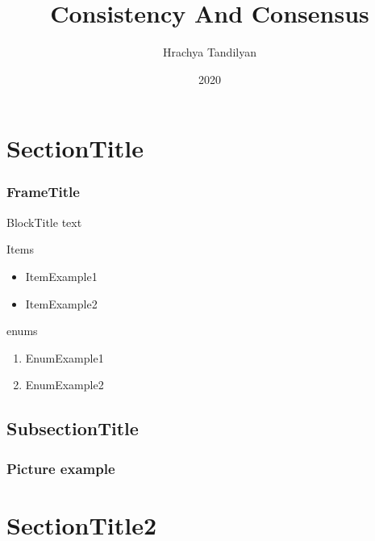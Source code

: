 \documentclass{beamer}
\begin{document}
\title[Consistency And Consensus]{Consistency And Consensus}
\author[Hrachya Tandilyan\copyright]{Hrachya Tandilyan}
\date{2020}

\begin{frame}
\titlepage
\end{frame}

\section{SectionTitle}
\begin{frame}\frametitle{FrameTitle}
\begin{block}{BlockTitle}
    text
\end{block}
\vfill
Items
\begin{itemize}
    \item ItemExample1
    \item ItemExample2
\end{itemize}
\vfill
enums
\begin{enumerate}
    \item EnumExample1
    \item EnumExample2
\end{enumerate}
\end{frame}

\subsection{SubsectionTitle}
\begin{frame}\frametitle{Picture example}
\end{frame}

\section{SectionTitle2}
\end{document}
